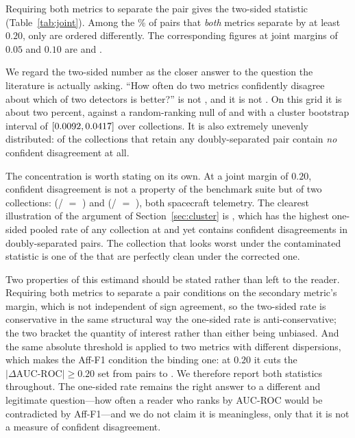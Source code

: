 \documentclass[twoside,11pt]{article}
\newcommand{\afff}{\mbox{Aff-F1}}
\newcommand{\auc}{\mbox{AUC-ROC}}
\begin{document}
Requiring both metrics to separate the pair gives the two-sided statistic
(Table~\ref{tab:joint}). Among the \TsbadJointShareTwoZero\% of pairs that
\emph{both} metrics separate by at least $0.20$, only \TsbadJointTwoZero{} are
ordered differently. The corresponding figures at joint margins of $0.05$ and
$0.10$ are \TsbadJointZeroFive{} and \TsbadJointOneZero{}.

We regard the two-sided number as the closer answer to the question the
literature is actually asking. ``How often do two metrics confidently disagree
about which of two detectors is better?'' is not \TsbadFlipAff{}, and it is not
\TsbadGapTwoZeroToInf{}. On this grid it is about two percent, against a
random-ranking null of \JointNullTwoZero{} and with a cluster bootstrap
interval of $[0.0092, 0.0417]$ over collections. It is
also extremely unevenly distributed: \JointZeroCollTwoZero{} of the
\JointNCollTwoZero{} collections that retain any doubly-separated pair contain
\emph{no} confident disagreement at all.

The concentration is worth stating on its own. At a joint margin of $0.20$,
confident disagreement is not a property of the benchmark suite but of two
collections: \JointFirstCollTwoZero{}
(\JointFirstCollFlipsTwoZero/\JointFirstCollPairsTwoZero{} $=$
\JointFirstCollRateTwoZero{}) and \JointSecondCollTwoZero{}
(\JointSecondCollFlipsTwoZero/\JointSecondCollPairsTwoZero{} $=$
\JointSecondCollRateTwoZero{}), both spacecraft telemetry. The clearest
illustration of the argument of Section~\ref{sec:cluster} is \CollMaxName{},
which has the highest one-sided pooled rate of any collection at
\CollMaxRate{} and yet contains \JointGhlFlipsTwoZero{} confident
disagreements in \JointGhlPairsTwoZero{} doubly-separated pairs. The collection
that looks worst under the contaminated statistic is one of the
\JointZeroCollTwoZero{} that are perfectly clean under the corrected one.

Two properties of this estimand should be stated rather than left to the reader.
Requiring both metrics to separate a pair conditions on the secondary metric's
margin, which is not independent of sign agreement, so the two-sided rate is
conservative in the same structural way the one-sided rate is anti-conservative;
the two bracket the quantity of interest rather than either being unbiased. And
the same absolute threshold is applied to two metrics with different dispersions,
which makes the \afff{} condition the binding one: at $0.20$ it cuts the
$|\Delta\auc{}| \geq 0.20$ set from \TsbadGapPairsTwoZeroToInf{} pairs to
\TsbadJointPairsTwoZero{}. We therefore report both statistics throughout. The
one-sided rate remains the right answer to a different and legitimate
question---how often a reader who ranks by \auc{} would be contradicted by
\afff{}---and we do not claim it is meaningless, only that it is not a measure
of confident disagreement.
\end{document}
